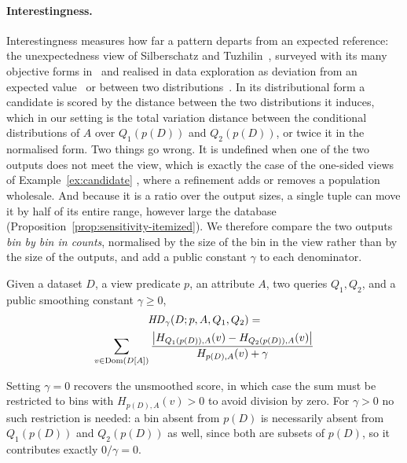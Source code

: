 \paragraph{Interestingness.}
Interestingness measures how far a pattern departs from an expected reference: the unexpectedness view of Silberschatz and Tuzhilin~\cite{SilberschatzT96}, surveyed with its many objective forms in~\cite{GengHamilton06,TanKS02} and realised in data exploration as deviation from an expected value~\cite{Sarawagi98} or between two distributions~\cite{SeeDB,FEDEX}.
In its distributional form a candidate is scored by the distance between the two distributions it induces, which in our setting is the total variation distance between the conditional distributions of $A$ over $Q_1(p(D))$ and $Q_2(p(D))$, or twice it in the normalised form.
Two things go wrong.
It is undefined when one of the two outputs does not meet the view, which is exactly the case of the one-sided views of Example~\ref{ex:candidate} , where a refinement adds or removes a population wholesale.
And because it is a ratio over the output sizes, a single tuple can move it by half of its entire range, however large the database (Proposition~\ref{prop:sensitivity-itemized}).
We therefore compare the two outputs \emph{bin by bin in counts}, normalised by the size of the bin in the view rather than by the size of the outputs, and add a public constant $\gamma$ to each denominator.

\begin{definition}
\label{def:hd}
Given a dataset $D$, a view predicate $p$, an attribute $A$, two queries $Q_1,Q_2$, and a public smoothing constant $\gamma \ge 0$,
\begin{multline}
\mathit{HD}_\gamma(D;p,A,Q_1,Q_2) = \\
\sum_{v\in \operatorname{Dom}(D[A])}
\frac{\big|H_{Q_1(p(D)),A}(v)-H_{Q_2(p(D)),A}(v)\big|}
     {H_{p(D),A}(v)+\gamma}
\label{eq:hd-definition}
\end{multline}
\end{definition}

Setting $\gamma=0$ recovers the unsmoothed score, in which case the sum must be restricted to bins with $H_{p(D),A}(v)>0$ to avoid division by zero.
For $\gamma>0$ no such restriction is needed: a bin absent from $p(D)$ is necessarily absent from $Q_1(p(D))$ and $Q_2(p(D))$ as well, since both are subsets of $p(D)$, so it contributes exactly $0/\gamma=0$.

